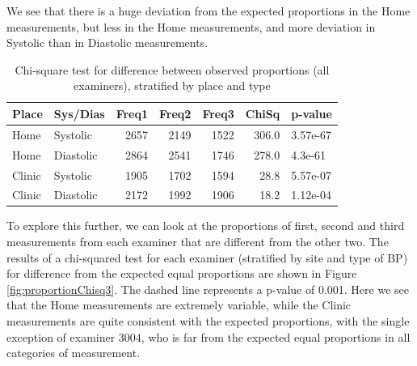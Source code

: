 \documentclass[
]{article}
\begin{document}
We see that there is a huge deviation from the expected proportions in the Home measurements, but less in the Home measurements, and more deviation in Systolic than in Diastolic measurements.

\begin{table}[!h]

\caption{\label{tab:proportionChisq}Chi-square test for difference between observed proportions (all examiners), stratified by place and type}
\centering
\begin{tabular}[t]{llrrrrl}
\toprule
Place & Sys/Dias & Freq1 & Freq2 & Freq3 & ChiSq & p-value\\
\midrule
Home & Systolic & 2657 & 2149 & 1522 & 306.0 & 3.57e-67\\
Home & Diastolic & 2864 & 2541 & 1746 & 278.0 & 4.3e-61\\
Clinic & Systolic & 1905 & 1702 & 1594 & 28.8 & 5.57e-07\\
Clinic & Diastolic & 2172 & 1992 & 1906 & 18.2 & 1.12e-04\\
\bottomrule
\end{tabular}
\end{table}

To explore this further, we can look at the proportions of first, second and third measurements from each examiner that are different from the other two.
The results of a chi-squared test for each examiner (stratified by site and type of BP) for difference from the expected equal proportions are shown in Figure \ref{fig:proportionChisq3}.
The dashed line represents a p-value of 0.001.
Here we see that the Home measurements are extremely variable, while the Clinic measurements are quite consistent with the expected proportions, with the single exception of examiner 3004, who is far from the expected equal proportions in all categories of measurement.
\end{document}
